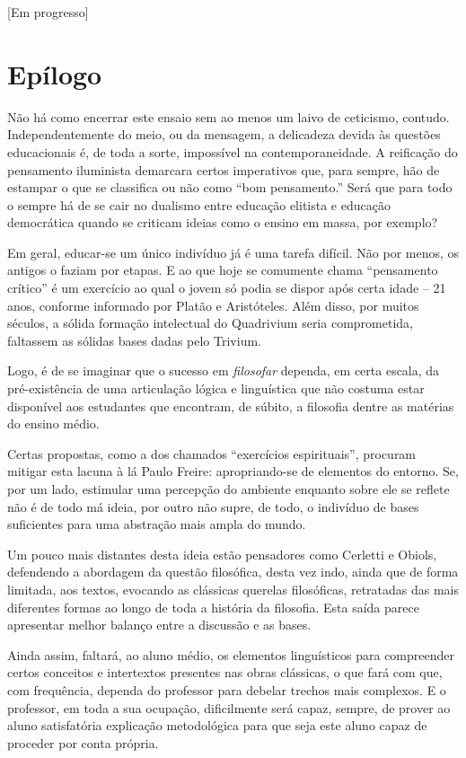 \documentclass[12pt,a4paper]{article}
\begin{document}
	[Em progresso]
	

	\newpage
	
	\section{Epílogo}

	Não há como encerrar este ensaio sem ao menos um laivo de ceticismo, 
	contudo. Independentemente do meio, ou da mensagem, a delicadeza 
	devida às questões educacionais é, de toda a sorte, impossível na 
	contemporaneidade. A reificação do pensamento iluminista demarcara 
	certos imperativos que, para sempre, hão de estampar o que se 
	classifica ou não como “bom pensamento.” Será que para todo o sempre 
	há de se cair no dualismo entre educação elitista e educação 
	democrática quando se criticam ideias como o ensino em massa, 
	por exemplo? 

	Em geral, educar-se um único indivíduo já é uma tarefa difícil. 
	Não por menos, os antigos o faziam por etapas. E ao que hoje se 
	comumente chama “pensamento crítico” é um exercício ao qual o 
	jovem só podia se dispor após certa idade -- 21 anos, conforme 
	informado por Platão e Aristóteles. Além disso, por muitos 
	séculos, a sólida formação intelectual do Quadrivium seria 
	comprometida, faltassem as sólidas bases dadas pelo Trivium. 

	Logo, é de se imaginar que o sucesso em \textit{filosofar} 
	dependa, em certa escala, da pré-existência de uma articulação 
	lógica e linguística que não costuma estar disponível aos 
	estudantes que encontram, de súbito, a filosofia dentre as 
	matérias do ensino médio. 

	Certas propostas, como a dos chamados “exercícios espirituais”, 
	procuram mitigar esta lacuna à lá Paulo Freire: apropriando-se 
	de elementos do entorno. Se, por um lado, estimular uma percepção 
	do ambiente enquanto sobre ele se reflete não é de todo má ideia, 
	por outro não supre, de todo, o indivíduo de bases suficientes 
	para uma abstração mais ampla do mundo. 

	Um pouco mais distantes desta ideia estão pensadores como Cerletti e 
	Obiols, defendendo a abordagem da questão filosófica, desta vez 
	indo, ainda que de forma limitada, aos textos, evocando as clássicas 
	querelas filosóficas, retratadas das mais diferentes formas ao longo 
	de toda a história da filosofia. Esta saída parece apresentar 
	melhor balanço entre a discussão e as bases. 

	Ainda assim, faltará, 
	ao aluno médio, os elementos linguísticos para compreender certos 
	conceitos e intertextos presentes nas obras clássicas, o que fará 
	com que, com frequência, dependa do professor para debelar trechos 
	mais complexos. E o professor, em toda a sua ocupação, dificilmente 
	será capaz, sempre, de prover ao aluno satisfatória explicação 
	metodológica para que seja este aluno capaz de proceder por 
	conta própria. 
\end{document}
